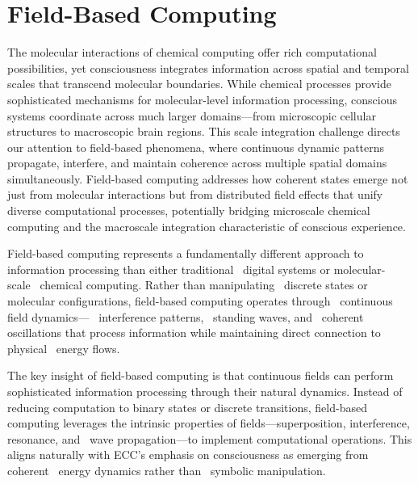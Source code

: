 \section{Field-Based Computing}

The molecular interactions of chemical computing offer rich computational possibilities, yet consciousness integrates information across spatial and temporal scales that transcend molecular boundaries. While chemical processes provide sophisticated mechanisms for molecular-level information processing, conscious systems coordinate across much larger domains—from microscopic cellular structures to macroscopic brain regions. This scale integration challenge directs our attention to field-based phenomena, where continuous dynamic patterns propagate, interfere, and maintain coherence across multiple spatial domains simultaneously. Field-based computing addresses how coherent states emerge not just from molecular interactions but from distributed field effects that unify diverse computational processes, potentially bridging microscale chemical computing and the macroscale integration characteristic of conscious experience.

 Field-based computing represents a fundamentally different approach to~ information processing than either traditional~ digital systems or molecular-scale~ chemical computing. Rather than manipulating~ discrete states or molecular configurations, field-based computing operates through~ continuous field dynamics—~ interference patterns,~ standing waves, and~ coherent oscillations that process information while maintaining direct connection to physical~ energy flows.

The key insight of field-based computing is that continuous fields can perform sophisticated information processing through their natural dynamics. Instead of reducing computation to binary states or discrete transitions, field-based computing leverages the intrinsic properties of fields—superposition, interference, resonance, and~ wave propagation—to implement computational operations. This aligns naturally with ECC's emphasis on consciousness as emerging from coherent~ energy dynamics rather than~ symbolic manipulation.

